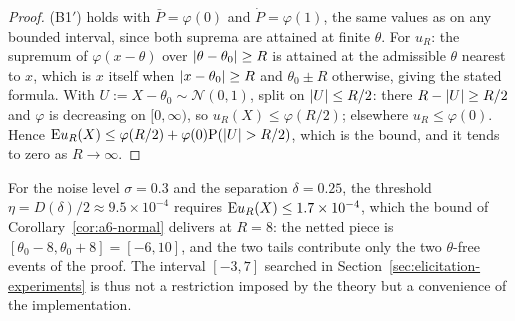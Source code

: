 \begin{proof}
(B1$'$) holds with $\bar P=\varphi(0)$ and $\dot P=\varphi(1)$, the same values as on any bounded interval, since both suprema are attained at finite $\theta$. For $u_R$: the supremum of $\varphi(x-\theta)$ over $\lvert\theta-\theta_0\rvert\ge R$ is attained at the admissible $\theta$ nearest to $x$, which is $x$ itself when $\lvert x-\theta_0\rvert\ge R$ and $\theta_0\pm R$ otherwise, giving the stated formula. With $U:=X-\theta_0\sim\mathcal{N}(0,1)$, split on $\lvert U\rvert\le R/2$: there $R-\lvert U\rvert\ge R/2$ and $\varphi$ is decreasing on $[0,\infty)$, so $u_R(X)\le\varphi(R/2)$; elsewhere $u_R\le\varphi(0)$. Hence $\mathrm{E} u_R(X)\le\varphi(R/2)+\varphi(0)\mathrm{P}(\lvert U\rvert>R/2)$, which is the bound, and it tends to zero as $R\to\infty$.
\end{proof}

For the noise level $\sigma=0.3$ and the separation $\delta=0.25$, the threshold $\eta=D(\delta)/2\approx9.5\times10^{-4}$ requires $\mathrm{E} u_R(X)\le1.7\times10^{-4}$, which the bound of Corollary~\ref{cor:a6-normal} delivers at $R=8$: the netted piece is $[\theta_0-8,\theta_0+8]=[-6,10]$, and the two tails contribute only the two $\theta$-free events of the proof. The interval $[-3,7]$ searched in Section~\ref{sec:elicitation-experiments} is thus not a restriction imposed by the theory but a convenience of the implementation.

